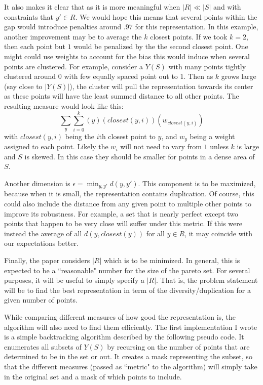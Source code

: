 \documentclass{article}
\begin{document}
It also makes it clear that as it is more meaningful when $|R| \ll |S|$ and with constraints that $y' \in R$.
We would hope this means that several points within the gap would introduce penalties around $.97$ for this representation.
In this example, another improvement may be to average the $k$ closest points.
If we took $k = 2$, then each point but $1$ would be penalized by the the second closest point.
One might could use weights to account for the bias this would induce when several points are clustered.
For example, consider a $Y(S)$ with many points tightly clustered around $0$ with few equally spaced point out to $1$.
Then as $k$ grows large (say close to $|Y(S)|$), the cluster will pull the representation towards its center as these points will have the least summed distance to all other points.
The resulting measure would look like this:
$$\sum_y \sum_{i=0}^k (y  )( closest(y, i) )( w_{closest(y, i)})$$
with $closest(y,i)$ being the $i$th closest point to $y$, and $w_y$ being a weight assigned to each point.
Likely the $w_i$ will not need to vary from $1$ unless $k$ is large and $S$ is skewed.
In this case they should be smaller for points in a dense area of $S$.


Another dimension is $\epsilon = \min_{y,y'} d(y,y')$.
This component is to be maximized, because when it is small, the representation contains duplication.
Of course, this could also include the distance from any given point to multiple other points to improve its robustness.
For example, a set that is nearly perfect except two points that happen to be very close will suffer under this metric.
If this were instead the average of all $d(y, closest(y))$ for all $y \in R$, it may coincide with our expectations better.

Finally, the paper considers $|R|$ which is to be minimized.
In general, this is expected to be a ``reasonable" number for the size of the pareto set.
For several purposes, it will be useful to simply specify a $|R|$.
That is, the problem statement will be to find the best representation in term of the diversity/duplication for a given number of points.


While comparing different measures of how good the representation is, the algorithm will also need to find them efficiently.
The first implementation I wrote is a simple backtracking algorithm described by the following pseudo code.
It enumerates all subsets of $Y(S)$ by recursing on the number of points that are determined to be in the set or out.
It creates a mask representing the subset, so that the different measures (passed as ``metric" to the algorithm) will simply take in the original set and a mask of which points to include.
\end{document}
